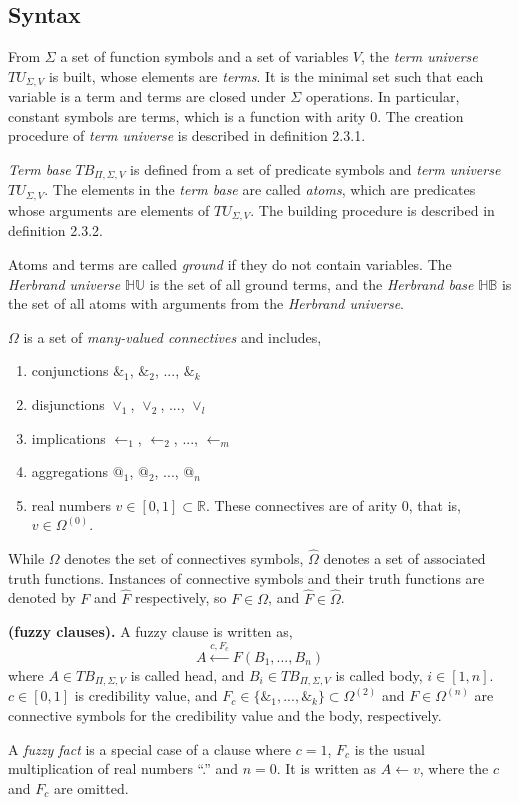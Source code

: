 \subsection{Syntax}
\label{sec:FuzzyFrameworkSyntax}
From $\Sigma$ a set of function symbols and a set of variables $V$, the \textit{term universe} $TU_{\Sigma,V}$ is built, whose elements are \textit{terms}. It is the minimal set such that each variable is a term and terms are closed under $\Sigma$ operations. In particular, constant symbols are terms, which is a function with arity $0$. The creation procedure of \textit{term universe} is described in definition 2.3.1.

\textit{Term base} $TB_{\Pi,\Sigma,V}$ is defined from a set of predicate symbols and \textit{term universe} $TU_{\Sigma,V}$. The elements in the \textit{term base} are called \textit{atoms}, which are predicates whose arguments are elements of $TU_{\Sigma,V}$. The building procedure is described in definition 2.3.2.

Atoms and terms are called \textit{ground} if they do not contain variables. The \textit{Herbrand universe} $\mathbb{HU}$ is the set of all ground terms, and the \textit{Herbrand base} $\mathbb{HB}$ is the set of all atoms with arguments from the \textit{Herbrand universe}.

$\Omega$ is a set of \textit{many-valued connectives} and includes,
\begin{enumerate}
 \item conjunctions $\&_1$, $\&_2$, ..., $\&_k$ 
 \item disjunctions $\vee_1$, $\vee_2$, ..., $\vee_l$
 \item implications $\leftarrow_1$, $\leftarrow_2$, ..., $\leftarrow_m$ 
 \item aggregations $@_1$, $@_2$, ..., $@_n$
 \item real numbers $v\in[0,1]\subset \mathbb{R}$. These connectives are of arity $0$, that is, $v\in\Omega^{(0)}$.
\end{enumerate}
While $\Omega$ denotes the set of connectives symbols, $\hat{\Omega}$ denotes a set of associated truth functions. Instances of connective symbols and their truth functions are denoted by $F$ and $\hat{F}$ respectively, so $F \in \Omega$, and $\hat{F} \in \hat{\Omega}$. 

\begin{defin}\textbf{(fuzzy clauses).}
\label{def:FuzzyClauses}
A fuzzy clause is written as,
\[A \stackrel{c,F_c}{\leftarrow} F(B_1,...,B_n)\]
where $A \in TB_{\Pi,\Sigma,V}$ is called head, and $B_i \in TB_{\Pi,\Sigma,V}$ is called body, $i \in [1,n]$. $c \in [0,1]$ is credibility value, and $F_c \in \{\&_1,...,\&_k\}\subset\Omega^{(2)}$ and $F\in\Omega^{(n)}$ are connective symbols for the credibility value and the body, respectively. 

A \textit{fuzzy fact} is a special case of a clause where $c=1$, $F_c$ is the usual multiplication of real numbers ``.'' and $n=0$. It is written as $A \leftarrow v$, where the $c$ and $F_c$ are omitted.
\end{defin}

